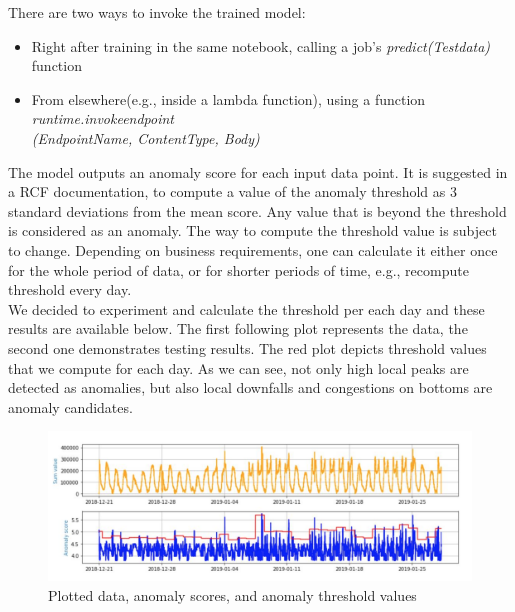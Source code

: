 There are two ways to invoke the trained model:
\begin{itemize}
    \item Right after training in the same notebook, calling a job’s \textit{predict(Test\textunderscore data)} function
    \item From elsewhere(e.g., inside a lambda function), using a function \textit{runtime.invoke\textunderscore endpoint\\(EndpointName, ContentType, Body)}
\end{itemize}
The model outputs an anomaly score for each input data point. It is suggested in a RCF documentation, to compute a value of the anomaly threshold as 3 standard deviations from the mean score. Any value that is beyond the threshold is considered as an anomaly. 
The way to compute the threshold value is subject to change. Depending on business requirements, one can calculate it either once for the whole period of data, or for shorter periods of time, e.g., recompute threshold every day.\\We decided to experiment and calculate the threshold per each day and these results are available below.
The first following plot represents the data, the second one demonstrates testing results. The red plot depicts threshold values that we compute for each day. As we can see, not only high local peaks are detected as anomalies, but also local downfalls and congestions on bottoms are anomaly candidates. 
\begin{figure}[h]
    \centering
    \includegraphics[width=1\textwidth]{images/rcf-results.png}
    \caption{Plotted data, anomaly scores, and anomaly threshold values}
    \label{fig:rcf_results}
\end{figure}
\FloatBarrier


